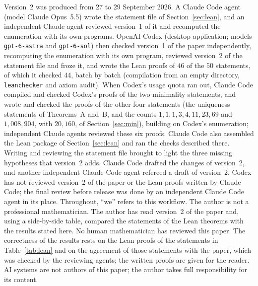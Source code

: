 \documentclass[11pt]{article}
\theoremstyle{remark}
\begin{document}
Version~2 was produced from 27 to 29 September 2026. A Claude Code agent
(model Claude Opus~5.5) wrote the statement file of
Section~\ref{sec:lean}, and an independent Claude agent reviewed version~1
of it and recomputed the enumeration with its own programs. OpenAI Codex
(desktop application; models \texttt{gpt-6-astra} and \texttt{gpt-6-sol}) then
checked version~1 of the paper independently, recomputing the enumeration with its own program, reviewed
version~2 of the statement file and froze it, and wrote the Lean proofs of
$46$ of the $50$ statements, of which it checked $44$, batch by batch
(compilation from an empty directory, \texttt{leanchecker} and axiom audit).
When Codex's usage quota ran out, Claude Code compiled and checked Codex's
proofs of the two minimality statements, and wrote and checked the proofs of
the other four statements (the uniqueness statements of Theorems~A and~B,
and the counts $1,1,1,3,4,11,23,69$ and $1{,}008{,}904$, with $20{,}160$, of
Section~\ref{sec:min}), building on Codex's enumeration; independent Claude
agents reviewed these six proofs. Claude Code also assembled the Lean package
of Section~\ref{sec:lean} and ran the checks described there. Writing and
reviewing the statement file brought to light the three missing hypotheses
that version~2 adds. Claude Code drafted the changes of version~2, and
another independent Claude Code agent refereed a draft of version~2. Codex
has not reviewed version~2 of the paper or the Lean proofs written by
Claude Code; the final review before release was done by an independent
Claude Code agent in its place.
Throughout, ``we'' refers to this workflow. The author is not a professional
mathematician.
The author has read version~2 of the paper and, using a side-by-side table,
compared the statements of the Lean theorems with the results stated here.
No human mathematician has reviewed this paper. The correctness of the
results rests on the Lean proofs of the statements in Table~\ref{tab:lean}
and on the agreement of those statements with the paper, which was checked
by the reviewing agents; the written proofs are given for the reader. AI
systems are not authors of this paper; the author takes full responsibility
for its content.
\end{document}
